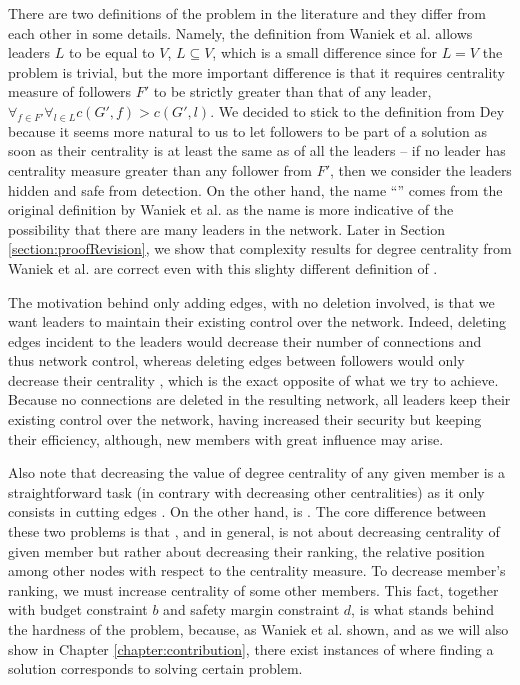 There are two definitions of the \HL problem in the literature and they differ from each other in some details.
Namely, the definition from Waniek et al. \cite{Waniek2017} allows leaders $L$ to be equal to $V$, $L \subseteq V$,
which is a small difference since for $L = V$ the problem is trivial, but the more important difference is that
it requires centrality measure of followers $F'$ to be strictly greater than that of any leader,
$\forall_{f \in F'} \forall_{l \in L} c(G', f) > c(G', l)$.
We decided to stick to the definition from Dey \cite{Dey2019} because it seems more natural to us to let followers
to be part of a solution as soon as their centrality is at least the same as of all the leaders --
if no leader has centrality measure greater than any follower from $F'$, then
we consider the leaders hidden and safe from detection.
On the other hand, the name ``\HL'' comes from the original definition by Waniek et al. as
the name is more indicative of the possibility that there are many leaders in the network.
Later in Section \ref{section:proofRevision}, we show that complexity results for degree centrality from Waniek et al.
are correct even with this slighty different definition of \HLshort.

The motivation behind only adding edges, with no deletion involved, is that we want leaders to maintain
their existing control over the network.
Indeed, deleting edges incident to the leaders would decrease their number of connections and thus network control,
whereas deleting edges between followers would only decrease their centrality ,
which is the exact opposite of what we try to achieve.
Because no connections are deleted in the resulting network, all leaders keep their existing control over the network,
having increased their security but keeping their efficiency, although, new members with great influence may arise.

Also note that decreasing the value of degree centrality of any given member is a straightforward task
(in contrary with decreasing other centralities) as it only consists in cutting edges \cite{Waniek2016}.
On the other hand, \HLdeg is \NPc \cite{Waniek2017}.
The core difference between these two problems is that \HLdeg, and \HLshort in general,
is not about decreasing centrality of given member but rather about decreasing their ranking,
the relative position among other nodes with respect to the centrality measure.
To decrease member's ranking, we must increase centrality of some other members.
This fact, together with budget constraint $b$ and safety margin constraint $d$,
is what stands behind the hardness of the \HL problem, because,
as Waniek et al. \cite{Waniek2017} shown, and as we will also show in Chapter \ref{chapter:contribution},
there exist instances of \HLshort where finding a solution corresponds to solving certain \NPh problem.

